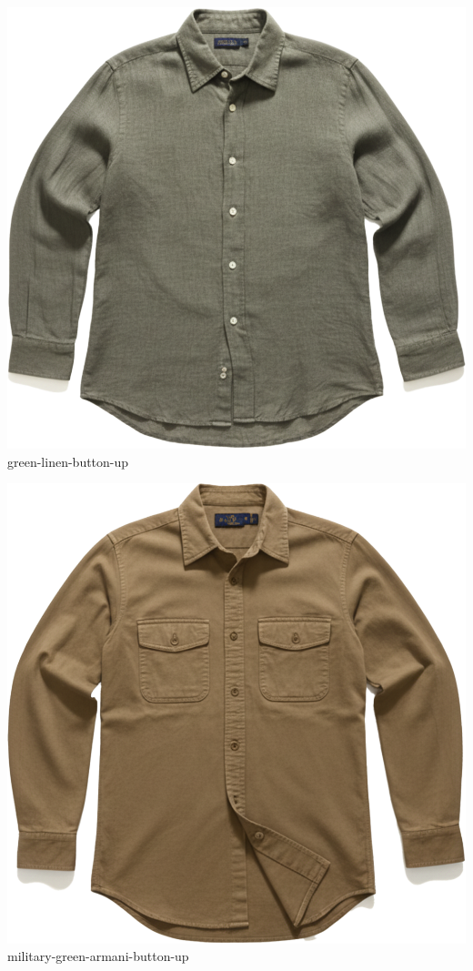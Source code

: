 \documentclass[10pt]{article}
\begin{document}
\begin{minipage}[t]{0.22\textwidth}\centering\vspace{0mm}
\includegraphics[width=\linewidth,keepaspectratio]{assets/midlayer/green-linen-button-up.png}\\
\vspace{0.5mm}\tiny green-linen-button-up\end{minipage}
\begin{minipage}[t]{0.22\textwidth}\centering\vspace{0mm}
\includegraphics[width=\linewidth,keepaspectratio]{assets/midlayer/military-green-armani-button-up.png}\\
\vspace{0.5mm}\tiny military-green-armani-button-up\end{minipage}
\end{document}

